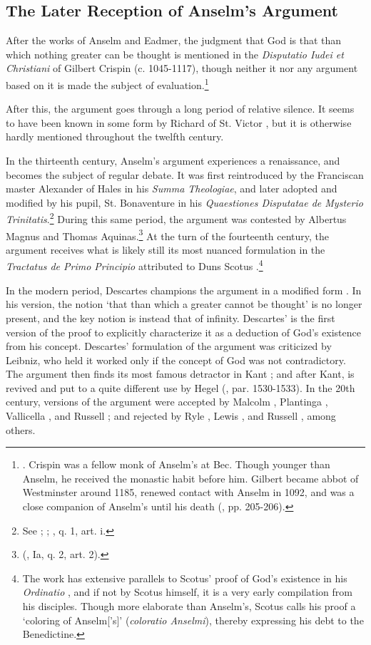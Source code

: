 \documentclass[]{birkjour}
\begin{document}
\subsection{The Later Reception of Anselm's Argument}
After the works of Anselm and Eadmer, the judgment that God is that than which nothing greater can be thought is mentioned in the \textit{Disputatio Iudei et Christiani} of Gilbert Crispin (c. 1045-1117), though neither it nor any argument based on it is made the subject of evaluation.\footnote{\cite{CrispinDisp}. Crispin was a fellow monk of Anselm's at Bec. Though younger than Anselm, he received the monastic habit before him. Gilbert became abbot of Westminster around 1185, renewed contact with Anselm in 1092, and was a close companion of Anselm's until his death (\cite{Southern1963}, pp. 205-206).}
	
After this, the argument goes through a long period of relative silence. It seems to have been known in some form by Richard of St. Victor \cite{RichardDT}, but it is otherwise hardly mentioned throughout the twelfth century.
	
In the thirteenth century, Anselm's argument experiences a renaissance, and becomes the subject of regular debate. It was first reintroduced by the Franciscan master Alexander of Hales in his \textit{Summa Theologiae}, and later adopted and modified by his pupil, St. Bonaventure in his \textit{Quaestiones Disputatae de Mysterio Trinitatis}.\footnote{See \cite{Seifert1992}; \cite{AlexanderST}; \cite{BonaventureTrinity}, q. 1, art. i.} During this same period, the argument was contested by Albertus Magnus and Thomas Aquinas.\footnote{(\cite{AquinasST}, Ia, q. 2, art. 2).} At the turn of the fourteenth century, the argument receives what is likely still its most nuanced formulation in the \textit{Tractatus de Primo Principio}  attributed to Duns Scotus \cite{Scotus1966}.\footnote{The work has extensive parallels to Scotus' proof of God's existence in his \textit{Ordinatio} \cite{ScotusOrd}, and if not by Scotus himself, it is a very early compilation from his disciples. Though more elaborate than Anselm's, Scotus calls his proof a `coloring of Anselm['s]' (\textit{coloratio Anselmi}), thereby expressing his debt to the Benedictine.}
	
In the modern period, Descartes champions the argument in a modified form \cite{Meditations}. In his version, the notion `that than which a greater cannot be thought' is no longer present, and the key notion is instead that of infinity. Descartes' is the first version of the proof to explicitly characterize it as a deduction of God's existence from his concept. Descartes' formulation of the argument was criticized by Leibniz, who held it worked only if the concept of God was not contradictory. The argument then finds its most famous detractor in Kant \cite{KantCritique1}; and after Kant, is revived and put to a quite different use by Hegel (\cite{HegelLogic}, par. 1530-1533). In the 20th century, versions of the argument were accepted by Malcolm \cite{Malcolm1960}, Plantinga \cite{Plantinga1965}, Vallicella \cite{Vallicella2000}, and Russell \cite{RussellAutobio}; and rejected by Ryle \cite{Ryle2009}, Lewis \cite{Lewis1970}, and Russell \cite{RussellAutobio}, among others.
	
\end{document}
